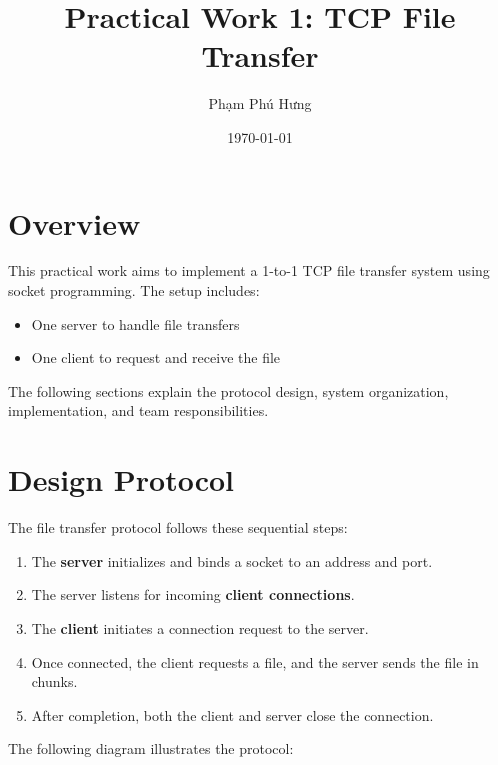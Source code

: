 \documentclass[a4paper,12pt]{article}
\title{Practical Work 1: TCP File Transfer}
\author{Phạm Phú Hưng}
\date{\today}
\begin{document}
\maketitle

\section*{Overview}
This practical work aims to implement a 1-to-1 TCP file transfer system using socket programming. The setup includes:
\begin{itemize}
    \item One server to handle file transfers
    \item One client to request and receive the file
\end{itemize}

The following sections explain the protocol design, system organization, implementation, and team responsibilities.

\section*{Design Protocol}
The file transfer protocol follows these sequential steps:
\begin{enumerate}
    \item The \textbf{server} initializes and binds a socket to an address and port.
    \item The server listens for incoming \textbf{client connections}.
    \item The \textbf{client} initiates a connection request to the server.
    \item Once connected, the client requests a file, and the server sends the file in chunks.
    \item After completion, both the client and server close the connection.
\end{enumerate}

The following diagram illustrates the protocol:
\end{document}
